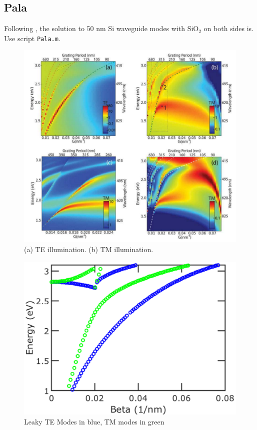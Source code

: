 \documentclass[12pt]{article}
\numberwithin{equation}{section}
\begin{document}
\subsection{Pala}

Following \cite{Pala:09}, the solution to 50 nm Si waveguide modes with SiO$_2$ on both sides is.
Use script \texttt{Pala.m}. 

\begin{figure}[H]
\centering 
\vspace{-10pt}
\includegraphics[scale=.5]{Figures/PalaFigure}
\caption{(a) TE illumination.  (b) TM illumination.}
\end{figure}

\begin{figure}[H]
\centering 
\vspace{-10pt}
\includegraphics[scale=.27]{Figures/PalaModes}
\caption{Leaky TE Modes in blue, TM modes in green}
\end{figure}
\end{document}
